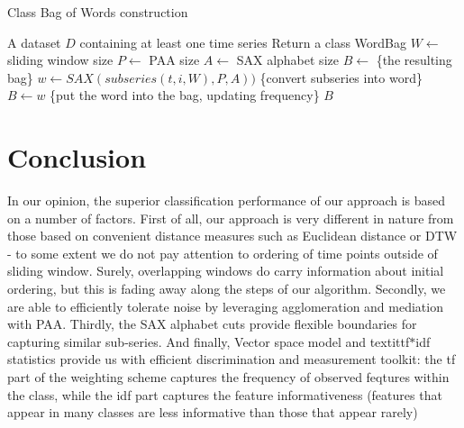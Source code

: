 \documentclass{llncs}
\begin{document}
\begin{algorithm}
\caption{Class Bag of Words construction}
\label{alg1}
\begin{algorithmic}[1]
\REQUIRE A dataset $D$ containing at least one time series
\ENSURE Return a class WordBag
\STATE $W \leftarrow$ sliding window size
\STATE $P \leftarrow$ PAA size
\STATE $A \leftarrow$ SAX alphabet size
\STATE $B \leftarrow$ \{the resulting bag\}
 \STATE $w \leftarrow SAX(subseries(t,i,W), P, A))$ \{convert subseries into word\}
 \STATE $B \leftarrow w$ \{put the word into the bag, updating frequency\}
 \ENDFOR
\ENDFOR
\RETURN $B$
\end{algorithmic}
\end{algorithm}


\section{Conclusion}
In our opinion, the superior classification performance of our approach is based on 
a number of factors. 
First of all, our approach is very different in nature from those 
based on convenient distance measures such as Euclidean distance or DTW - to some 
extent we do not pay attention to ordering of time points outside of sliding window. 
Surely, overlapping windows do carry information about initial ordering, but this 
is fading away along the steps of our algorithm.
Secondly, we are able to efficiently tolerate noise by leveraging agglomeration 
and mediation with PAA. 
Thirdly, the SAX alphabet cuts provide flexible boundaries for capturing similar 
sub-series. 
And finally, Vector space model and textit{tf$\ast$idf} statistics provide us 
with efficient discrimination and measurement toolkit: the tf part of the weighting scheme
captures the frequency of observed feqtures within the class, while the idf part 
captures the feature informativeness (features that appear in many classes 
are less informative than those that appear rarely)
\end{document}
